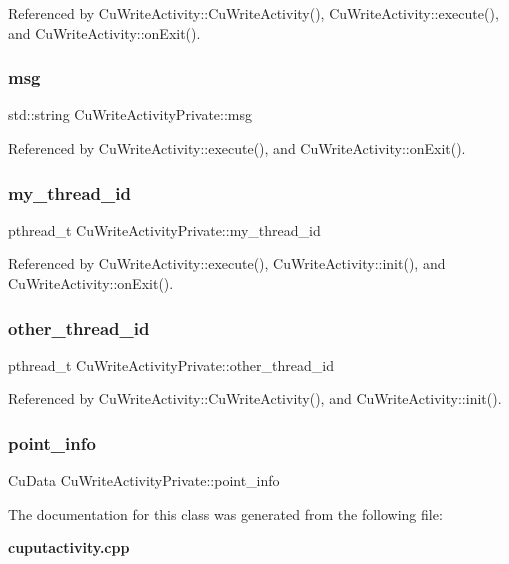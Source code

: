 Referenced by Cu\+Write\+Activity\+::\+Cu\+Write\+Activity(), Cu\+Write\+Activity\+::execute(), and Cu\+Write\+Activity\+::on\+Exit().

\mbox{\label{classCuWriteActivityPrivate_a84c08ce77441ed456685a0f2c8d6ac35}} 
\subsubsection{msg}
{\footnotesize\ttfamily std\+::string Cu\+Write\+Activity\+Private\+::msg}



Referenced by Cu\+Write\+Activity\+::execute(), and Cu\+Write\+Activity\+::on\+Exit().

\mbox{\label{classCuWriteActivityPrivate_a2a1bd9747fb88e389c4d7a0584fcdb8d}} 
\subsubsection{my\+\_\+thread\+\_\+id}
{\footnotesize\ttfamily pthread\+\_\+t Cu\+Write\+Activity\+Private\+::my\+\_\+thread\+\_\+id}



Referenced by Cu\+Write\+Activity\+::execute(), Cu\+Write\+Activity\+::init(), and Cu\+Write\+Activity\+::on\+Exit().

\mbox{\label{classCuWriteActivityPrivate_a166431d6df992d21599d7cfcdccdebc4}} 
\subsubsection{other\+\_\+thread\+\_\+id}
{\footnotesize\ttfamily pthread\+\_\+t Cu\+Write\+Activity\+Private\+::other\+\_\+thread\+\_\+id}



Referenced by Cu\+Write\+Activity\+::\+Cu\+Write\+Activity(), and Cu\+Write\+Activity\+::init().

\mbox{\label{classCuWriteActivityPrivate_a3b5730761a1b05648aebf80752cdafc7}} 
\subsubsection{point\+\_\+info}
{\footnotesize\ttfamily Cu\+Data Cu\+Write\+Activity\+Private\+::point\+\_\+info}



The documentation for this class was generated from the following file\+:\begin{DoxyCompactItemize}
\item 
\textbf{ cuputactivity.\+cpp}\end{DoxyCompactItemize}
